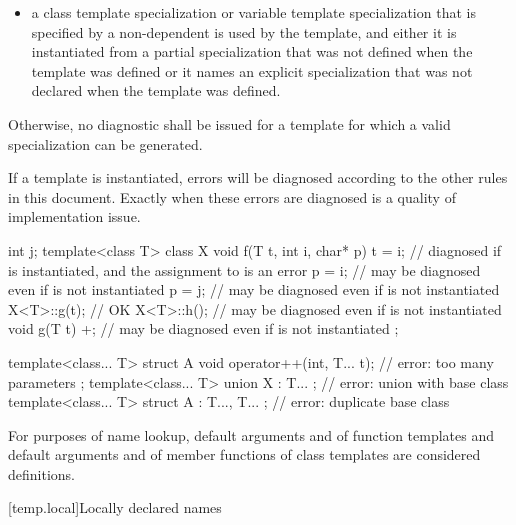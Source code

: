 \begin{itemize}
\begin{note}
\begin{itemize}
\item a class template specialization or variable template specialization that
is specified by a non-dependent  is used by
the template, and either it is instantiated from a partial specialization that
was not defined when the template was defined or it names an explicit
specialization that was not declared when the template was defined.
\end{itemize}
\end{note}
\end{itemize}

Otherwise, no diagnostic shall be issued for a template
for which a valid specialization can be generated.
\begin{note}
If a template is instantiated, errors will be diagnosed according
to the other rules in this document.
Exactly when these errors are diagnosed is a quality of implementation issue.
\end{note}
\begin{example}
\begin{codeblock}
int j;
template<class T> class X {
  void f(T t, int i, char* p) {
    t = i;          // diagnosed if  is instantiated, and the assignment to  is an error
    p = i;          // may be diagnosed even if  is not instantiated
    p = j;          // may be diagnosed even if  is not instantiated
    X<T>::g(t);     // OK
    X<T>::h();      // may be diagnosed even if  is not instantiated
  }
  void g(T t) {
    +;              // may be diagnosed even if  is not instantiated
  }
};

template<class... T> struct A {
  void operator++(int, T... t);                     // error: too many parameters
};
template<class... T> union X : T... { };            // error: union with base class
template<class... T> struct A : T...,  T... { };    // error: duplicate base class
\end{codeblock}
\end{example}

\pnum
\begin{note}
For purposes of name lookup, default arguments and
 of function templates and default
arguments and  of
member functions of class templates are considered definitions.
\end{note}

[temp.local]{Locally declared names}

